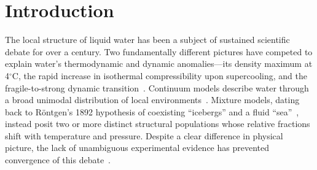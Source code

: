 \documentclass[aps, amsmath,amssymb, reprint, twocolumn,notitlepage,superscriptaddress]{revtex4-2}
\begin{document}
\section{Introduction}
The local structure of liquid water has been a subject of sustained scientific debate for over a century. Two fundamentally different pictures have competed to explain water's thermodynamic and dynamic anomalies---its density maximum at 4$^\circ$C, the rapid increase in isothermal compressibility upon supercooling, and the fragile-to-strong dynamic transition~\cite{gallo_water_2016}. Continuum models describe water through a broad unimodal distribution of local environments~\cite{narten_observed_1969, eisenberg_structure_2005}. Mixture models, dating back to R\"{o}ntgen's 1892 hypothesis of coexisting ``icebergs'' and a fluid ``sea''~\cite{rontgen-1892}, instead posit two or more distinct structural populations whose relative fractions shift with temperature and pressure. Despite a clear difference in physical picture, the lack of unambiguous experimental evidence has prevented convergence of this debate~\cite{narten_observed_1969, eisenberg_structure_2005, handle_supercooled_2017}.
\end{document}
